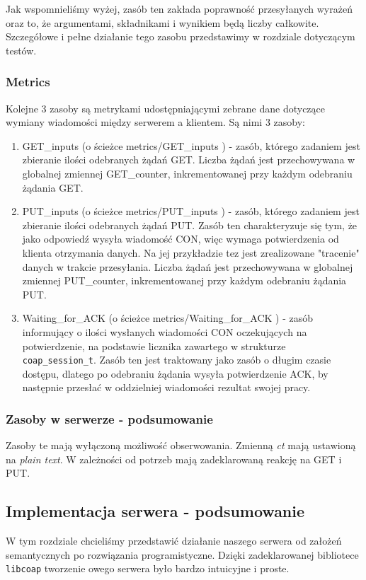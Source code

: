 Jak wspomnieliśmy wyżej, zasób ten zakłada poprawność przesyłanych wyrażeń oraz to, że argumentami, składnikami i wynikiem będą liczby całkowite. Szczegółowe i pełne działanie tego zasobu przedstawimy w rozdziale dotyczącym testów.

\subsubsection{Metrics}

Kolejne 3 zasoby są metrykami udostępniającymi zebrane dane dotyczące wymiany wiadomości między serwerem a klientem. Są nimi 3 zasoby:
\begin{enumerate}
    \item GET\_inputs (o ścieżce metrics/GET\_inputs ) - zasób, którego zadaniem jest zbieranie ilości odebranych żądań GET. Liczba żądań jest przechowywana w globalnej zmiennej GET\_counter, inkrementowanej przy każdym odebraniu żądania GET.
    \item PUT\_inputs (o ścieżce metrics/PUT\_inputs ) - zasób, którego zadaniem jest zbieranie ilości odebranych żądań PUT. Zasób ten charakteryzuje się tym, że jako odpowiedź wysyła wiadomość CON, więc wymaga potwierdzenia od klienta otrzymania danych. Na jej przykładzie tez jest zrealizowane "tracenie" danych w trakcie przesyłania. Liczba żądań jest przechowywana w globalnej zmiennej PUT\_counter, inkrementowanej przy każdym odebraniu żądania PUT.
    \item Waiting\_for\_ACK (o ścieżce metrics/Waiting\_for\_ACK ) - zasób informujący o ilości wysłanych wiadomości CON oczekujących na potwierdzenie, na podstawie licznika zawartego w strukturze \verb|coap_session_t|. Zasób ten jest traktowany jako zasób o długim czasie dostępu, dlatego po odebraniu żądania wysyła potwierdzenie ACK, by następnie przesłać w oddzielniej wiadomości rezultat swojej pracy.
\end{enumerate}

\subsubsection{Zasoby w serwerze - podsumowanie}

Zasoby te mają wyłączoną możliwość obserwowania. Zmienną \textit{ct} mają ustawioną na \textit{plain text}. W zależności od potrzeb mają zadeklarowaną reakcję na GET i PUT. 

\subsection{Implementacja serwera - podsumowanie}

W tym rozdziale chcieliśmy przedstawić działanie naszego serwera od założeń semantycznych po rozwiązania programistyczne. Dzięki zadeklarowanej bibliotece \verb|libcoap| tworzenie owego serwera było bardzo intuicyjne i proste.
